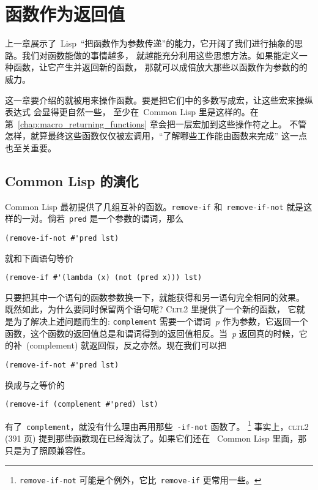 
\chapter{函数作为返回值}
\label{chap:returning_functions}

上一章展示了~Lisp~``把函数作为参数传递''的能力，它开阔了我们进行抽象的思路。我们对函数能做的事情越多，
就越能充分利用这些思想方法。如果能定义一种函数，让它产生并返回新的函数，
那就可以成倍放大那些以函数作为参数的\utility{}的威力。

这一章要介绍的\utility{}就被用来操作函数。要是把它们中的多数写成宏，让这些宏来操纵表达式
会显得更自然一些，
至少在~Common Lisp 里是这样的。在第~\ref{chap:macro_returning_functions}
章会把一层宏加到这些操作符之上。
不管怎样，就算最终这些函数仅仅被宏调用，``了解哪些工作能由函数来完成'' 这一点也至关重要。

\section{Common Lisp 的演化}
\label{sec:common_lisp_evolves}

Common Lisp 最初提供了几组互补的函数。\texttt{remove-if} 和~\texttt{remove-if-not}
就是这样的一对。倘若~\texttt{pred} 是一个参数的谓词，那么
\begin{lstlisting}
(remove-if-not #'pred lst)
\end{lstlisting}
就和下面语句等价
\begin{lstlisting}
(remove-if #'(lambda (x) (not (pred x))) lst)
\end{lstlisting}

只要把其中一个语句的函数参数换一下，就能获得和另一语句完全相同的效果。
既然如此，为什么要同时保留两个语句呢? \textsc{Cltl}2 里提供了一个新的函数，
它就是为了解决上述问题而生的: \texttt{complement}
 需要一个谓词~\emph{p}
作为参数，它返回一个函数，这个函数的返回值总是和谓词得到的返回值相反。当~\emph{p} 
返回真的时候，它的补~(complement) 就返回假，反之亦然。现在我们可以把
\begin{lstlisting}
(remove-if-not #'pred lst)
\end{lstlisting}
换成与之等价的
\begin{lstlisting}
(remove-if (complement #'pred) lst)
\end{lstlisting}
有了~\texttt{complement}，就没有什么理由再用那些~\verb|-if-not| 函数了。
\footnote{\texttt{remove-if-not} 可能是个例外，它比~\texttt{remove-if}
  更常用一些。} 
事实上，\textsc{cltl}2 (391 页) 提到那些函数现在已经淘汰了。如果它们还在~
Common Lisp 里面，那只是为了照顾兼容性。

